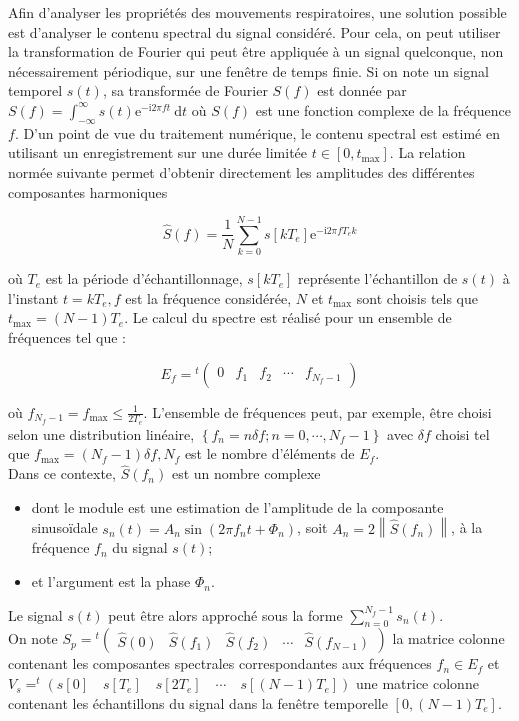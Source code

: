 \ifprof
\else
Afin d'analyser les propriétés des mouvements respiratoires, une solution possible est d'analyser le contenu spectral du signal considéré. Pour cela, on peut utiliser la transformation de Fourier qui peut être appliquée à un signal quelconque, non nécessairement périodique, sur une fenêtre de temps finie. Si on note un signal temporel $s(t)$, sa transformée de Fourier $S(f)$ est donnée par $S(f)=\int_{-\infty}^{\infty} s(t) \mathrm{e}^{-\mathrm{i} 2 \pi f t} \mathrm{~d} t$ où $S(f)$ est une fonction complexe de la fréquence $f$. D'un point de vue du traitement numérique, le contenu spectral est estimé en utilisant un enregistrement sur une durée limitée $t \in\left[0, t_{\max }\right]$. La relation normée suivante permet d'obtenir directement les amplitudes des différentes composantes harmoniques

$$
\hat{S}(f)=\frac{1}{N} \sum_{k=0}^{N-1} s\left[k T_{e}\right] \mathrm{e}^{-\mathrm{i} 2 \pi f T_{e} k}
$$

où $T_{e}$ est la période d'échantillonnage, $s\left[k T_{e}\right]$ représente l'échantillon de $s(t)$ à l'instant $t=k T_{e}, f$ est la fréquence considérée, $N$ et $t_{\max }$ sont choisis tels que $t_{\max }=(N-1) T_{e}$. Le calcul du spectre est réalisé pour un ensemble de fréquences tel que :

$$
E_{f}={ }^{t}\left(\begin{array}{lllll}
0 & f_{1} & f_{2} & \cdots & f_{N_{f}-1}
\end{array}\right)
$$

où $f_{N_{f}-1}=f_{\max } \leqslant \frac{1}{2 T_{e}}$. L'ensemble de fréquences peut, par exemple, être choisi selon une distribution linéaire, $\left\{f_{n}=n \delta f ; n=0, \cdots, N_{f}-1\right\}$ avec $\delta f$ choisi tel que $f_{\max }=\left(N_{f}-1\right) \delta f, N_{f}$ est le nombre d'éléments de $E_{f}$.\\
Dans ce contexte, $\hat{S}\left(f_{n}\right)$ est un nombre complexe

\begin{itemize}
  \item dont le module est une estimation de l'amplitude de la composante sinusoïdale $s_{n}(t)=A_{n} \sin \left(2 \pi f_{n} t+\Phi_{n}\right)$, soit $A_{n}=2\left\|\hat{S}\left(f_{n}\right)\right\|$, à la fréquence $f_{n}$ du signal $s(t)$;
  \item et l'argument est la phase $\Phi_{n}$.
\end{itemize}

Le signal $s(t)$ peut être alors approché sous la forme $\sum_{n=0}^{N_{f}-1} s_{n}(t)$.\\
On note $S_{p}={ }^{t}\left(\begin{array}{lllll}\hat{S}(0) & \hat{S}\left(f_{1}\right) & \hat{S}\left(f_{2}\right) & \cdots & \hat{S}\left(f_{N-1}\right)\end{array}\right)$ la matrice colonne contenant les composantes spectrales correspondantes aux fréquences $f_{n} \in E_{f}$ et $V_{s}=^{t}\left(s[0] \quad s\left[T_{e}\right] \quad s\left[2 T_{e}\right] \quad \cdots \quad s\left[(N-1) T_{e}\right]\right)$ une matrice colonne contenant les échantillons du signal dans la fenêtre temporelle $\left[0,(N-1) T_{e}\right]$.\\
\fi

